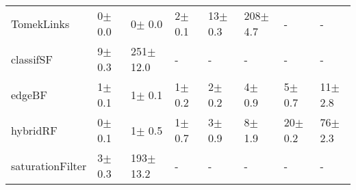 \begin{tabular}{llllllll}
TomekLinks       &   0$\pm$ 0.0 &     0$\pm$ 0.0 &     2$\pm$ 0.1 &   13$\pm$ 0.3 &   208$\pm$ 4.7 &            - &             - \\
classifSF        &   9$\pm$ 0.3 &  251$\pm$ 12.0 &              - &             - &              - &            - &             - \\
edgeBF           &   1$\pm$ 0.1 &     1$\pm$ 0.1 &     1$\pm$ 0.2 &    2$\pm$ 0.2 &     4$\pm$ 0.9 &   5$\pm$ 0.7 &   11$\pm$ 2.8 \\
hybridRF         &   0$\pm$ 0.1 &     1$\pm$ 0.5 &     1$\pm$ 0.7 &    3$\pm$ 0.9 &     8$\pm$ 1.9 &  20$\pm$ 0.2 &   76$\pm$ 2.3 \\
saturationFilter &   3$\pm$ 0.3 &  193$\pm$ 13.2 &              - &             - &              - &            - &             - \\
\bottomrule
\end{tabular}
